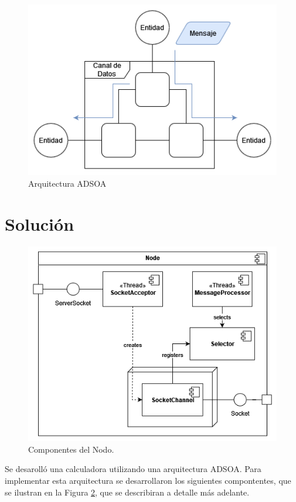 \documentclass[conference,compsoc]{IEEEtran}
\begin{document}
\begin{figure}[hbt]
    \centering
    \includegraphics[width=0.75\columnwidth]{adsoa_architecture.png}
    \caption{Arquitectura ADSOA}
    \label{fig:adsoa}
\end{figure}

\section{Solución}

\begin{figure}[hbt]
    \centering
    \includegraphics[width=0.9\columnwidth]{node_components.png}
    \caption{Componentes del Nodo.}
    \label{fig:components}
\end{figure}

Se desarolló una calculadora utilizando una arquitectura ADSOA. Para implementar esta arquitectura se desarrollaron los siguientes compontentes, que se ilustran en la Figura \ref{fig:components}, que se describiran a detalle más adelante.
\end{document}
